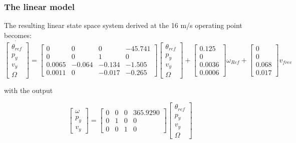 \subsubsection{The linear model} \label{sec:linear_model}
The resulting linear state space system derived at the 16 m/s operating point becomes:
\begin{equation}\label{eq:xdot}
	\dot{\begin{bmatrix} \theta_{ref} \\
						p_y \\ 
						v_y \\
						\Omega \end{bmatrix}} = 
	\begin{bmatrix} 0       &  0        & 0 		& -45.741	\\
					0       &  0   		& 1    		& 0			\\
					0.0065  & -0.064	& -0.134	& -1.505	\\
					0.0011  &       0  	& -0.017	& -0.265\end{bmatrix}
	\begin{bmatrix} \theta_{ref} \\
					p_y \\ 
					v_y \\
					\Omega \end{bmatrix} + 
	\begin{bmatrix} 0.125 	\\
					0		\\
					0.0036	\\
					0.0006\end{bmatrix} \omega_{Ref} + 
	\begin{bmatrix} 0	\\
					0		\\
					0.068 	\\
					0.017 \end{bmatrix} v_{free}
\end{equation}

\smallskip
\noindent with the output

\begin{equation}\label{eq:y}
	\begin{bmatrix} \omega \\ 
					p_y \\
					v_y \end{bmatrix} = 
	\begin{bmatrix}	0  	& 0 	& 0  	& 365.9290	\\
					0  	& 1  	& 0 	& 0			\\
					0	& 0 	& 1 	& 0 \end{bmatrix}
	\begin{bmatrix} \theta_{ref} \\
					p_y \\ 
					v_y \\
					\Omega \end{bmatrix}
\end{equation}

